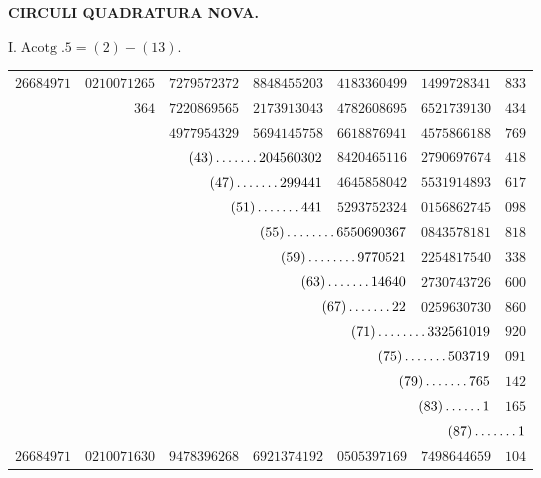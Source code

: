 \clearpage
\renewcommand{\BookRunningTitle}{Circuli quadratura nova}
%
\begin{center}\textbf{CIRCULI QUADRATURA NOVA.}\end{center}
\begin{center}I.\quad $\operatorname{Acotg}.5=(2)-(13).$\end{center}
\begingroup\fontsize{8.5}{11}\selectfont\setlength{\tabcolsep}{2pt}
\begin{longtable}{@{}rrrrrrr@{}}
\hline
$26684971$ & $0210071265$ & $7279572372$ & $8848455203$ & $4183360499$ & $1499728341$ & $833$\\
 & $364$ & $7220869565$ & $2173913043$ & $4782608695$ & $6521739130$ & $434$\\
 &  & $4977954329$ & $5694145758$ & $6618876941$ & $4575866188$ & $769$\\
 &  & \multicolumn{2}{r}{$(43)\mathinner{.\,.\,.\,.\,.\,.\,.}204560302$} & $8420465116$ & $2790697674$ & $418$\\
 &  & \multicolumn{2}{r}{$(47)\mathinner{.\,.\,.\,.\,.\,.\,.}299441$} & $4645858042$ & $5531914893$ & $617$\\
 &  & \multicolumn{2}{r}{$(51)\mathinner{.\,.\,.\,.\,.\,.\,.}441$} & $5293752324$ & $0156862745$ & $098$\\
 &  &  & \multicolumn{2}{r}{$(55)\mathinner{.\,.\,.\,.\,.\,.\,.\,.}6550690367$} & $0843578181$ & $818$\\
 &  &  & \multicolumn{2}{r}{$(59)\mathinner{.\,.\,.\,.\,.\,.\,.\,.}9770521$} & $2254817540$ & $338$\\
 &  &  & \multicolumn{2}{r}{$(63)\mathinner{.\,.\,.\,.\,.\,.\,.}14640$} & $2730743726$ & $600$\\
 &  &  & \multicolumn{2}{r}{$(67)\mathinner{.\,.\,.\,.\,.\,.\,.}22$} & $0259630730$ & $860$\\
 &  &  &  & \multicolumn{2}{r}{$(71)\mathinner{.\,.\,.\,.\,.\,.\,.\,.}332561019$} & $920$\\
 &  &  &  & \multicolumn{2}{r}{$(75)\mathinner{.\,.\,.\,.\,.\,.\,.}503719$} & $091$\\
 &  &  &  & \multicolumn{2}{r}{$(79)\mathinner{.\,.\,.\,.\,.\,.\,.}765$} & $142$\\
 &  &  &  & \multicolumn{2}{r}{$(83)\mathinner{.\,.\,.\,.\,.\,.}1$} & $165$\\
 &  &  &  &  & \multicolumn{2}{r}{$(87)\mathinner{.\,.\,.\,.\,.\,.\,.}1$}\\
\hline
$26684971$ & $0210071630$ & $9478396268$ & $6921374192$ & $0505397169$ & $7498644659$ & $104$\\

\end{longtable}

